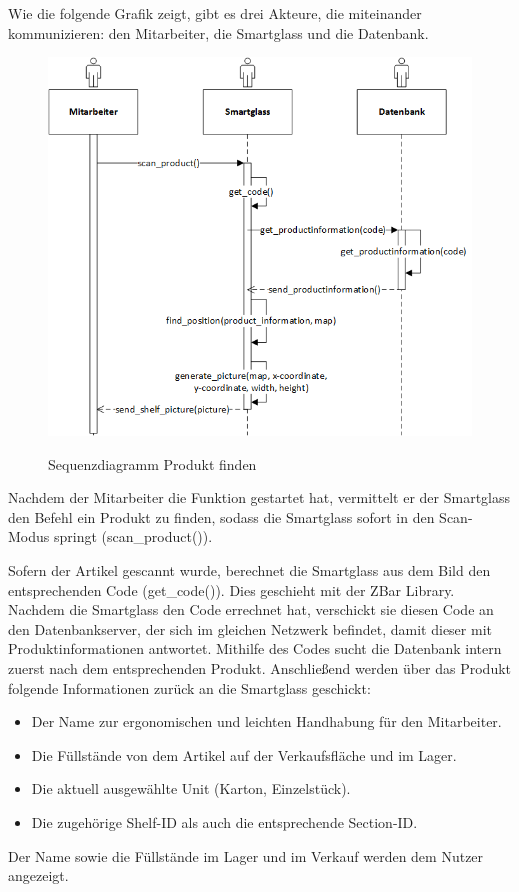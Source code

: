 Wie die folgende Grafik zeigt, gibt es drei Akteure, die miteinander kommunizieren: den Mitarbeiter, die Smartglass und die Datenbank.
\begin{figure}[H]
	\centering
	{\includegraphics[scale=0.8]{Bilder/Abbildungen/SMAR_produkt_finden_Sequenzdiagramm.png}}
	\caption{Sequenzdiagramm Produkt finden}
	\label{fig:jwt_encode}
\end{figure}
Nachdem der Mitarbeiter die Funktion gestartet hat, vermittelt er der Smartglass den Befehl ein Produkt zu finden, sodass die Smartglass sofort in den Scan-Modus springt (scan\_product()). 

Sofern der Artikel gescannt wurde, berechnet die Smartglass aus dem Bild den entsprechenden Code (get\_code()). Dies geschieht mit der ZBar Library. Nachdem die Smartglass den Code errechnet hat, verschickt sie diesen Code an den Datenbankserver, der sich im gleichen Netzwerk befindet, damit dieser mit Produktinformationen antwortet. Mithilfe des Codes sucht die Datenbank intern zuerst nach dem entsprechenden Produkt. Anschließend werden über das Produkt folgende Informationen zurück an die Smartglass geschickt:
\begin{itemize}
	\item Der Name zur ergonomischen und leichten Handhabung für den Mitarbeiter.
	\item Die Füllstände von dem Artikel auf der Verkaufsfläche und im  Lager.
	\item Die aktuell ausgewählte Unit (Karton, Einzelstück).
	\item Die zugehörige Shelf-ID als auch die entsprechende Section-ID.
\end{itemize}
Der Name sowie die Füllstände im Lager und im Verkauf werden dem Nutzer angezeigt.

